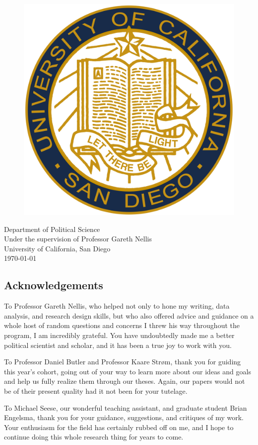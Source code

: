 \documentclass[12pt]{article}
\begin{document}
\begin{titlepage}
\vfill
\begin{figure}[H]
\begin{center}
\includegraphics[width = .2\textwidth]{ucsd_seal.png}
\end{center}
\end{figure}

\begin{center}	
Department of Political Science\\
Under the supervision of Professor Gareth Nellis\\
University of California, San Diego\\
\today
\end{center}

\end{titlepage}


\tableofcontents

\listoffigures

\listoftables

\pagebreak


\begin{center}\section*{Acknowledgements}\end{center}
To Professor Gareth Nellis, who helped not only to hone my writing, data analysis, and research design skills, but who also offered advice and guidance on a whole host of random questions and concerns I threw his way throughout the program, I am incredibly grateful. You have undoubtedly made me a better political scientist and scholar, and it has been a true joy to work with you.   

To Professor Daniel Butler and Professor Kaare Strøm, thank you for guiding this year's cohort, going out of your way to learn more about our ideas and goals and help us fully realize them through our theses. Again, our papers would not be of their present quality had it not been for your tutelage.

To Michael Seese, our wonderful teaching assistant, and graduate student Brian Engelsma, thank you for your guidance, suggestions, and critiques of my work. Your enthusiasm for the field has certainly rubbed off on me, and I hope to continue doing this whole research thing for years to come. 
\end{document}

